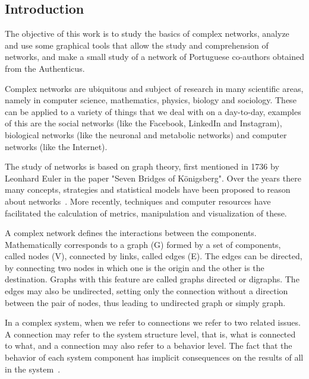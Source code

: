 \documentclass{article}
\begin{document}

\begin{multicols}{2}


\section{Introduction}

The objective of this work is to study the basics of complex networks, analyze and use some graphical tools that allow the study and comprehension of networks, and make a small study of a network of Portuguese co-authors obtained from the Authenticus.

Complex networks are ubiquitous and subject of research in many scientific areas, namely in computer science, mathematics, physics, biology and sociology. These can be applied to a variety of things that we deal with on a day-to-day, examples of this are the social networks (like the Facebook, LinkedIn and Instagram), biological networks (like the neuronal and metabolic networks) and computer networks (like the Internet).

The study of networks is based on graph theory, first mentioned in 1736 by Leonhard Euler in the paper "Seven Bridges of Königsberg". Over the years there many concepts, strategies and statistical models have been proposed to reason about networks~\cite{NCM, NS}. More recently, techniques and computer resources have facilitated the calculation of metrics, manipulation and visualization of these.

A complex network defines the interactions between the components. Mathematically corresponds to a graph (G) formed by a set of components, called nodes (V), connected by links, called edges (E). The edges can be directed, by connecting two nodes  in which one is the origin and the other is the destination.  Graphs with this feature are called graphs directed or digraphs. The edges may also be undirected, setting only the connection without a direction between the pair of nodes, thus leading to undirected graph or simply graph.  

In a complex system, when we refer to connections we refer to two related issues. A connection may refer to the system structure level, that is, what is connected to what, and a connection may also refer to a behavior level. The fact that the behavior of each system component has implicit consequences on the results of all in the system~\cite{NCM}.


\end{multicols}
\end{document}
